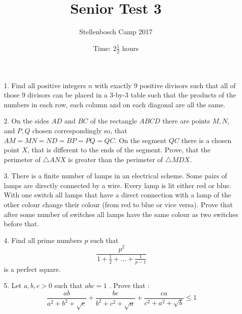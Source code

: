 \documentclass[12pt]{article}
\title{Senior Test 3}
\author{Stellenbosch Camp 2017}
\date{Time: $2\frac{1}{2}$ hours}
\begin{document}
 \maketitle

\begin{enumerate}

\item[1.] %
Find all positive integers $n$ with exactly 9 positive divisors such that all of those 9 divisors can be placed in a 3-by-3 table such that the products of the numbers in each row, each column and on each diagonal are all the same.


\item[2.] %
On the sides $AD$ and $BC$ of the rectangle $ABCD$ there are points $M, N$, and $P, Q$ chosen correspondingly so, that $AM = MN = ND = BP = PQ = QC$. On the segment $QC$ there is a chosen point $X$, that is different to the ends of the segment. Prove, that the perimeter of $\triangle ANX$ is greater than the perimeter of $\triangle MDX$.


\item[3.] %
There is a finite number of lamps in an electrical scheme. Some pairs of lamps are directly connected by a wire. Every lamp is lit either red or blue. With one switch all lamps that have a direct connection with a lamp of the other colour change their colour (from red to blue or vice versa). Prove that after some number of switches all lamps have the same colour as two switches before that.


\item[4.] Find all prime numbers $p$ such that
$$\frac{p^2}{1+\frac{1}{2}+\dots+\frac{1}{p-1}}$$
is a perfect square.


\item[5.] %
Let $ a,b,c > 0$ such that $ abc = 1$ . Prove that :
    $$ \frac {ab}{a^2 + b^2 + \sqrt {c}} + \frac {bc}{b^2 + c^2 + \sqrt {a}} + \frac {ca}{c^2 + a^2 + \sqrt {b}}\le 1 $$


\end{enumerate}
\end{document}
